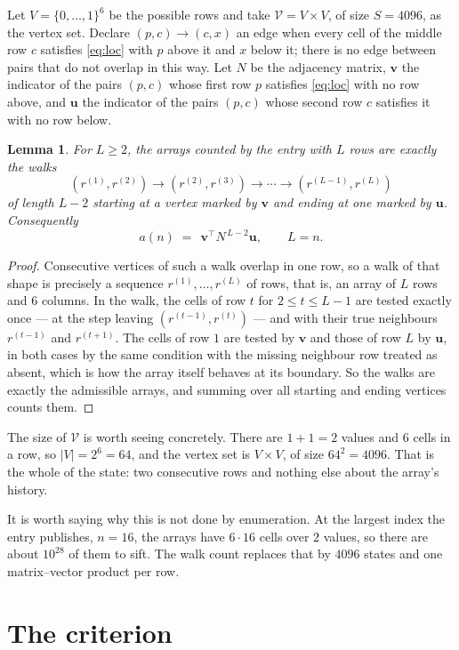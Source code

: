 \documentclass[11pt,a4paper]{article}
\theoremstyle{plain}
\newtheorem{lemma}[theorem]{Lemma}
\theoremstyle{definition}
\begin{document}
Let $V=\{0,\dots,1\}^{6}$ be the possible rows and take
$\mathcal V=V\times V$, of size $S=4096$, as the vertex set. Declare $(p,c)\to(c,x)$ an edge
when every cell of the middle row $c$ satisfies \eqref{eq:loc} with $p$ above it and $x$
below it; there is no edge between pairs that do not overlap in this way. Let $N$ be the
adjacency matrix, $\mathbf{v}$ the indicator of the pairs $(p,c)$ whose first row $p$
satisfies \eqref{eq:loc} with no row above, and $\mathbf{u}$ the indicator of
the pairs $(p,c)$ whose second row $c$ satisfies it with no row below.

\begin{lemma}\label{lem:walk}
For $L\ge2$, the arrays counted by the entry with $L$ rows are exactly the walks
\[
(r^{(1)},r^{(2)})\to(r^{(2)},r^{(3)})\to\cdots\to(r^{(L-1)},r^{(L)})
\]
of length $L-2$ starting at a vertex marked by $\mathbf{v}$ and ending at one marked by
$\mathbf{u}$. Consequently
\[
a(n)\;=\;\,\mathbf{v}^{\!\top}N^{\,L-2}\mathbf{u},\qquad L=n .
\]
\end{lemma}

\begin{proof}
Consecutive vertices of such a walk overlap in one row, so a walk of that shape is
precisely a sequence $r^{(1)},\dots,r^{(L)}$ of rows, that is, an array of $L$ rows
and $6$ columns. In the walk, the cells of row $t$ for $2\le t\le L-1$ are tested
exactly once --- at the step leaving $(r^{(t-1)},r^{(t)})$ --- and with their true
neighbours $r^{(t-1)}$ and $r^{(t+1)}$. The cells of row $1$ are tested by
$\mathbf{v}$ and those of row $L$ by $\mathbf{u}$, in both cases by the same condition
with the missing neighbour row treated as absent, which is how the array itself behaves at
its boundary. So the walks are exactly the admissible arrays, and summing over all starting
and ending vertices counts them.
\end{proof}


The size of $\mathcal V$ is worth seeing concretely. There are $1+1=2$ values
and $6$ cells in a row, so $|V|=2^{6}=64$, and the vertex set is
$V\times V$, of size $64^2=4096$. That is the whole of the state: two consecutive
rows and nothing else about the array's history.

It is worth saying why this is not done by enumeration. At the largest index the entry
publishes, $n=16$, the arrays have $6\cdot16$ cells over
$2$ values, so there are about $10^{28}$ of them to sift. The
walk count replaces that by $4096$ states and one matrix--vector product per row.
\section{The criterion}
\end{document}
